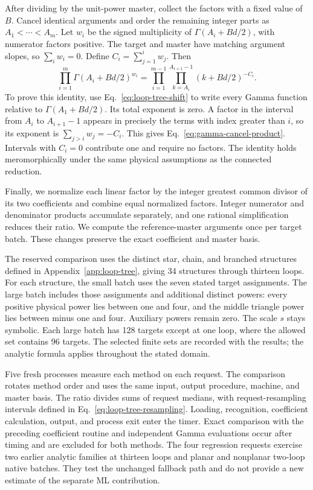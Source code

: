 After dividing by the unit-power master, collect the factors with a fixed value of $B$. Cancel identical arguments and order the remaining integer parts as $A_1<\cdots<A_m$. Let $w_i$ be the signed multiplicity of $\Gamma(A_i+Bd/2)$, with numerator factors positive. The target and master have matching argument slopes, so $\sum_i w_i=0$. Define $C_i=\sum_{j=1}^i w_j$. Then
\begin{equation}
 \prod_{i=1}^{m}\Gamma(A_i+Bd/2)^{w_i}
 =\prod_{i=1}^{m-1}\prod_{k=A_i}^{A_{i+1}-1}
       (k+Bd/2)^{-C_i}.
 \label{eq:gamma-cancel-product}
\end{equation}
To prove this identity, use Eq.~\eqref{eq:loop-tree-shift} to write every Gamma function relative to $\Gamma(A_1+Bd/2)$. Its total exponent is zero. A factor in the interval from $A_i$ to $A_{i+1}-1$ appears in precisely the terms with index greater than $i$, so its exponent is $\sum_{j>i}w_j=-C_i$. This gives Eq.~\eqref{eq:gamma-cancel-product}. Intervals with $C_i=0$ contribute one and require no factors. The identity holds meromorphically under the same physical assumptions as the connected reduction.

Finally, we normalize each linear factor by the integer greatest common divisor of its two coefficients and combine equal normalized factors. Integer numerator and denominator products accumulate separately, and one rational simplification reduces their ratio. We compute the reference-master arguments once per target batch. These changes preserve the exact coefficient and master basis.

The reserved comparison uses the distinct star, chain, and branched structures defined in Appendix~\ref{app:loop-tree}, giving 34 structures through thirteen loops. For each structure, the small batch uses the seven stated target assignments. The large batch includes those assignments and additional distinct powers: every positive physical power lies between one and four, and the middle triangle power lies between minus one and four. Auxiliary powers remain zero. The scale $s$ stays symbolic. Each large batch has 128 targets except at one loop, where the allowed set contains 96 targets. The selected finite sets are recorded with the results; the analytic formula applies throughout the stated domain.

Five fresh processes measure each method on each request. The comparison rotates method order and uses the same input, output procedure, machine, and master basis. The ratio divides sums of request medians, with request-resampling intervals defined in Eq.~\eqref{eq:loop-tree-resampling}. Loading, recognition, coefficient calculation, output, and process exit enter the timer. Exact comparison with the preceding coefficient routine and independent Gamma evaluations occur after timing and are excluded for both methods. The four regression requests exercise two earlier analytic families at thirteen loops and planar and nonplanar two-loop native batches. They test the unchanged fallback path and do not provide a new estimate of the separate ML contribution.
